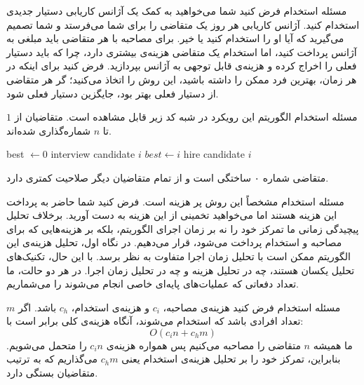 \begin{itemframe}{مسئله استخدام}
\itm
فرض کنید شما می‌خواهید به کمک یک آژانس کاریابی دستیار جدیدی استخدام کنید.
آژانس کاریابی هر روز یک متقاضی را برای شما می‌فرستد و شما تصمیم می‌گیرید که آیا او را استخدام کنید یا خیر.
برای مصاحبه با هر متقاضی باید مبلغی به آژانس پرداخت کنید،
اما استخدام یک متقاضی هزینه‌ی بیشتری دارد، چرا که باید دستیار فعلی را اخراج کرده و هزینه‌ی قابل توجهی به آژانس بپردازید.
\itm
فرض کنید برای اینکه در هر زمان، بهترین فرد ممکن را داشته باشید، این روش را اتخاذ می‌کنید؛ گر هر متقاضی از دستیار فعلی بهتر بود، جایگزین دستیار فعلی شود.
\end{itemframe}


\begin{itemframe}{مسئله استخدام}
\itm
الگوریتم این رویکرد در شبه کد زیر قابل مشاهده است. متقاضیان از $1$ تا $n$ شماره‌گذاری شده‌اند.
\begin{algorithm}[H]\alglr
\caption{HIRE-ASSISTANT}
\begin{algorithmic}[1]
  \State best $\gets 0$ 
    \State interview candidate $i$
      \State $best \gets i$
      \State hire candidate $i$
    \EndIf
  \EndFor
\EndProcedure
\end{algorithmic}
\end{algorithm}
\itm
متقاضی شماره ۰ ساختگی است و از تمام متقاضیان دیگر صلاحیت کمتری دارد.
\end{itemframe}


\begin{itemframe}{مسئله استخدام}
\itm
مشخصاً این روش پر هزینه است. فرض کنید شما حاضر به پرداخت این هزینه هستند اما می‌‌خواهید تخمینی از این هزینه به دست آورید.
\itm
برخلاف تحلیل پیچیدگی زمانی ما تمرکز خود را نه بر زمان اجرای الگوریتم، بلکه بر هزینه‌هایی که برای مصاحبه و استخدام پرداخت می‌شود، قرار می‌دهیم.
\itm
در نگاه اول، تحلیل هزینه‌ی این الگوریتم ممکن است با تحلیل زمان اجرا متفاوت به نظر برسد.
با این حال، تکنیک‌های تحلیل یکسان هستند، چه در تحلیل هزینه و چه در تحلیل زمان اجرا. در هر دو حالت، ما تعداد دفعاتی که عملیات‌های پایه‌ای خاصی انجام می‌شوند را می‌شماریم.
\end{itemframe}


\begin{itemframe}{مسئله استخدام}
\itm
فرض کنید هزینه‌ی مصاحبه، $c_i$ و هزینه‌ی استخدام، $c_h$ باشد.
اگر $m$ تعداد افرادی باشد که استخدام می‌شوند، آنگاه هزینه‌ی کلی برابر است با:
$$
O(c_i n + c_h m)
$$
\itm
ما همیشه $n$ متقاضی را مصاحبه می‌کنیم پس همواره هزینه‌ی $c_i n$ را متحمل می‌شویم.
بنابراین، تمرکز خود را بر تحلیل هزینه‌ی استخدام یعنی $c_h m$ می‌گذاریم که به ترتیب متقاضیان بستگی دارد.


\end{itemframe}



